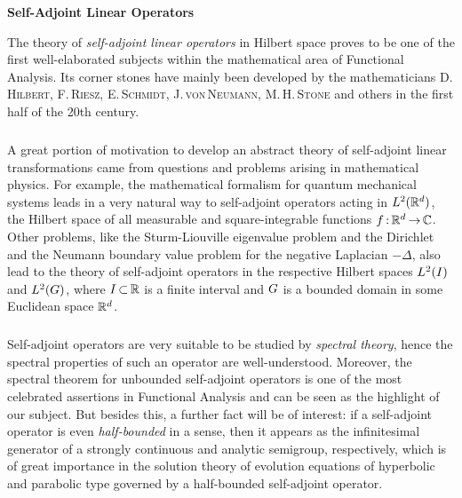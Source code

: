 \documentclass[11pt,twoside]{article}
\renewcommand*{\thepage}{(\roman{page})}
\begin{document}
\thispagestyle{empty}

\def\Title{Self-Adjoint Linear Operators}


\centerline{\large{\textbf{\Title}}}
\vspace{4pt}
\centerline{\small{\textsc{\Author}}}
\vspace{10pt}



\fancyhead[C]{\small{\textsc{\Title}}}
\fancyhead[R]{\small{\thepage}}

The theory of \textit{self-adjoint linear operators} in Hilbert space
proves to be one of the first well-elaborated subjects
within the mathematical area of Functional Analysis.
Its corner stones have mainly been developed by the mathematicians 
\textsc{D.\,Hilbert},
\textsc{F.\,Riesz},
\textsc{E.\,Schmidt},
\textsc{J.\,von\,Neumann},
\textsc{M.\,H.\,Stone} and others in the first half of the 20th century.

\subparagraph{}
A great portion of motivation to develop
an abstract theory of self-adjoint linear transformations came
from questions and problems arising in mathematical physics.
For example,
the mathematical formalism for quantum mechanical systems leads
in a very natural way to self-adjoint operators acting in $L^2({\mathbb{R}}^d)$,
the Hilbert space of all 
measurable and square-integrable functions $f{\,:\,}{\mathbb{R}}^d {\,\to\,} {\mathbb{C}}$.
Other problems,
like the Sturm-Liouville eigenvalue problem and
the Dirichlet and the Neumann boundary value problem
for the negative Laplacian $-\Delta$,
also lead to the theory of self-adjoint operators
in the respective Hilbert spaces $L^2(I)$ and $L^2(G)$,
where $I {\,\subset\,} {\mathbb{R}}$ is a finite interval 
and $G$ is a bounded domain in some Euclidean space ${\mathbb{R}}^d$.

\subparagraph{}
Self-adjoint operators are very suitable to be studied
by \textit{spectral theory},
hence the spectral properties of such an operator are well-understood.
Moreover,
the spectral theorem for unbounded self-adjoint operators is one
of the most celebrated assertions in Functional Analysis
and can be seen as the highlight of our subject.
But besides this, 
a further fact will be of interest:
if a self-adjoint operator is even \textit{half-bounded} in a sense,
then it appears as the infinitesimal generator
of a strongly continuous and analytic semigroup,
respectively,
which is of great importance in the solution theory of evolution equations
of hyperbolic and parabolic type
governed by a half-bounded self-adjoint operator.
\end{document}
